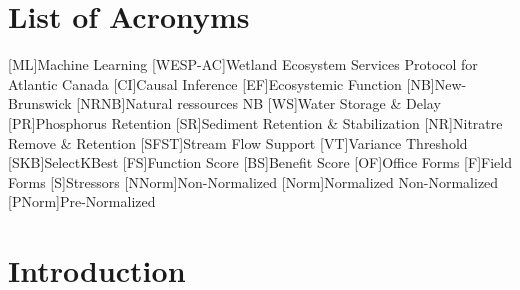 \documentclass[12pt,letterpaper]{article}
\begin{document}
\section*{List of Acronyms}
\begin{acronym}
[ML]{Machine Learning}
[WESP-AC]{Wetland Ecosystem Services Protocol for Atlantic Canada}
[CI]{Causal Inference}
[EF]{Ecosystemic Function}
[NB]{New-Brunswick}
[NRNB]{Natural ressources NB}
[WS]{Water Storage \& Delay}
[PR]{Phosphorus Retention}
[SR]{Sediment Retention \& Stabilization}
[NR]{Nitratre Remove \& Retention}
[SFST]{Stream Flow Support}
[VT]{Variance Threshold}
[SKB]{SelectKBest}
[FS]{Function Score}
[BS]{Benefit Score}
[OF]{Office Forms}
[F]{Field Forms}
[S]{Stressors}
[NNorm]{Non-Normalized}
[Norm]{Normalized Non-Normalized}
[PNorm]{Pre-Normalized}
\end{acronym}




\section{Introduction}
\end{document}
